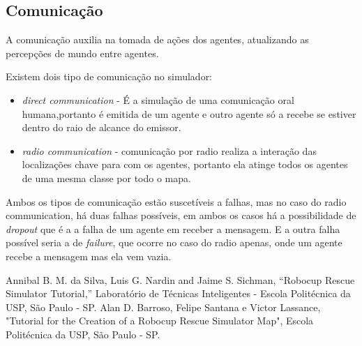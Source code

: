 \documentclass[conference]{IEEEtran}
\begin{document}
\subsection{Comunicação}
A comunicação auxilia na tomada de ações dos agentes, atualizando as percepções de mundo entre agentes.

Existem dois tipo de comunicação no simulador:
\begin{itemize}
\item \textit {direct communication} - É a simulação de uma comunicação oral humana,portanto é emitida de um agente e outro agente só a recebe se estiver dentro do raio de alcance do emissor.
\item \textit {radio communication} - comunicação por radio realiza a interação das localizações chave para com os agentes, portanto ela atinge todos os agentes de uma mesma classe por todo o mapa.
\end{itemize}

Ambos os tipos de comunicação estão suscetíveis a falhas, mas no caso do radio communication, há duas falhas possíveis, em ambos os casos há a possibilidade de \textit{dropout} que é a a falha de um agente em receber a mensagem. E a outra falha possível seria a de \textit{failure}, que ocorre no caso do radio apenas, onde um agente recebe a mensagem mas ela vem vazia.

\begin{thebibliography}{00}
 Annibal B. M. da Silva, Luis G. Nardin and Jaime S. Sichman, ``Robocup Rescue Simulator Tutorial,'' Laboratório de Técnicas Inteligentes - Escola Politécnica da USP, São Paulo - SP.
 Alan D. Barroso, Felipe Santana e Victor Lassance, "Tutorial for the Creation of a Robocup Rescue Simulator Map", Escola Politécnica da USP, São Paulo - SP.

\end{thebibliography}
\end{document}
